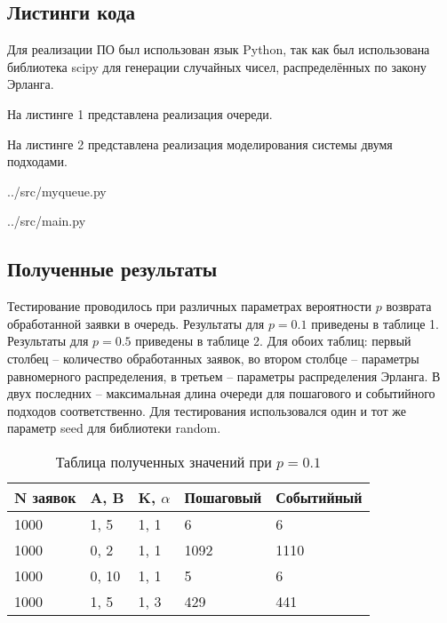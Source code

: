 \subsection*{Листинги кода}
Для реализации ПО был использован язык Python, так как был использована библиотека scipy для генерации случайных чисел, распределённых по закону Эрланга.

На листинге 1 представлена реализация очереди.

На листинге 2 представлена реализация моделирования системы двумя подходами. 

\begin{lstinputlisting}[language=Python, caption=Реализация очереди, linerange={12-25}, 
	basicstyle=\footnotesize\ttfamily, frame=single,breaklines=true]{../src/myqueue.py}
\end{lstinputlisting}
\FloatBarrier

\FloatBarrier
\begin{lstinputlisting}[language=Python, caption=Реализация моделирования системы двумя подходами, linerange={7-14}, 
	basicstyle=\footnotesize\ttfamily, frame=single, breaklines=true]{../src/main.py}
\end{lstinputlisting}
\FloatBarrier



\subsection*{Полученные результаты}
Тестирование проводилось при различных параметрах вероятности $p$ возврата обработанной заявки в очередь. 
Результаты для $p = 0.1$ приведены в таблице 1.
Результаты для $p = 0.5$ приведены в таблице 2.
Для обоих таблиц: первый столбец -- количество обработанных заявок, во втором столбце -- параметры равномерного распределения, в третьем -- параметры распределения Эрланга.
В двух последних -- максимальная длина очереди для пошагового и событийного подходов соответственно.
Для тестирования использовался один и тот же параметр seed для библиотеки random.

\FloatBarrier
\begin{table}[h]
	\caption{Таблица полученных значений при $ p = 0.1 $}
	\centering
	\begin{tabular}{ | l | l | l | l | l |}
		\hline
		N заявок & A, B & K, $\alpha$ & Пошаговый & Событийный  \\ 
		\hline
		1000 & 1, 5 & 1, 1 & 6 & 6 \\
		\hline
		1000 & 0, 2 & 1, 1 & 1092 & 1110 \\
		\hline
		1000 & 0, 10 & 1, 1 & 5 & 6 \\
		\hline
		1000 & 1, 5 & 1, 3 & 429 & 441 \\
		\hline
	\end{tabular}
\end{table}
\FloatBarrier


